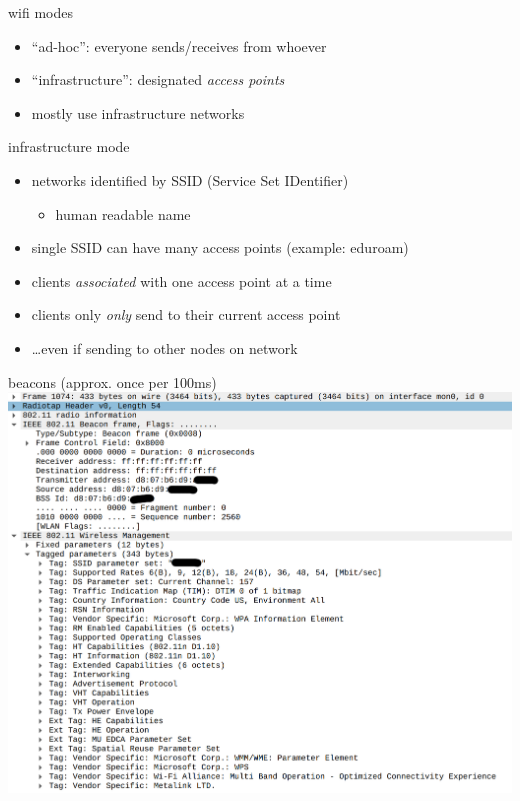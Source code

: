 \begin{frame}{wifi modes}
    \begin{itemize}
    \item ``ad-hoc'': everyone sends/receives from whoever
    \item ``infrastructure'': designated \textit{access points}
    \vspace{.5cm}
    \item mostly use infrastructure networks
    \end{itemize}
\end{frame}

\begin{frame}{infrastructure mode}
    \begin{itemize}
    \item networks identified by SSID (Service Set IDentifier)
        \begin{itemize}
        \item human readable name
        \end{itemize}
    \item single SSID can have many access points (example: eduroam)
    \item clients \textit{associated} with one access point at a time
    \vspace{.5cm}
    \item clients only \textit{only} send to their current access point
    \item \ldots even if sending to other nodes on network
    \end{itemize}
\end{frame}

\begin{frame}{beacons (approx. once per 100ms)}
\includegraphics[height=0.85\textheight]{../multiaccess/wifi-beacon-1.png}
\end{frame}

